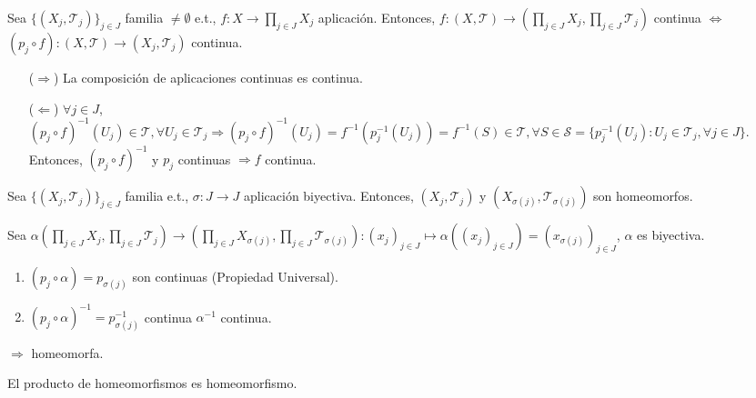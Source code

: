\begin{prop}
  Sea $\{ ( X_{j}, \mathcal{T}_{j} ) \}_{j \in J}$ familia $\neq \emptyset$ e.t., $f: X \to \prod_{j \in J} X_{j}$ aplicación. Entonces, $f: ( X, \mathcal{T} ) \to ( \prod_{j \in J} X_{j}, \prod_{j \in J} \mathcal{T}_{j} )$ continua $\Leftrightarrow$ $(p_{j} \circ f): ( X, \mathcal{T} ) \to ( X_{j}, \mathcal{T}_{j} )$ continua.
\end{prop}

\begin{dem}
  \begin{enumerate}[label=(\roman*)]
    \item [($\Rightarrow$)] La composición de aplicaciones continuas es continua.
    \item [($\Leftarrow$)] $\forall j \in J$, $(p_{j} \circ f)^{-1}(U_{j}) \in \mathcal{T}, \forall U_{j} \in \mathcal{T}_{j} \Rightarrow (p_{j} \circ f)^{-1}(U_{j}) = f^{-1}(p_{j}^{-1}(U_{j})) = f^{-1}(S) \in \mathcal{T}, \forall S \in \mathcal{S} = \{ p_{j}^{-1}(U_{j}) : U_{j} \in \mathcal{T}_{j}, \forall j \in J \}$. Entonces, $(p_{j} \circ f)^{-1}$ y $p_{j}$ continuas $\Rightarrow f$ continua.
  \end{enumerate}
\end{dem}

\begin{prop}
  Sea $\{ ( X_{j}, \mathcal{T}_{j} ) \}_{j \in J}$ familia e.t., $\sigma: J \to J$ aplicación biyectiva. Entonces, $( X_{j}, \mathcal{T}_{j} )$ y $( X_{\sigma(j)}, \mathcal{T}_{\sigma(j)} )$ son homeomorfos.
\end{prop}

\begin{dem}
  Sea $\alpha ( \prod_{j \in J} X_{j}, \prod_{j \in J} \mathcal{T}_{j} ) \to ( \prod_{j \in J} X_{\sigma(j)}, \prod_{j \in J} \mathcal{T}_{\sigma(j)} ): ( x_{j} )_{j \in J} \mapsto \alpha(( x_{j} )_{j \in J}) = ( x_{\sigma(j)} )_{j \in J}$, $\alpha$ es biyectiva.
  \begin{enumerate}[label=(\roman*)]
    \item $(p_{j} \circ \alpha) = p_{\sigma(j)}$ son continuas (Propiedad Universal).
    \item $(p_{j} \circ \alpha)^{-1} = p_{\sigma(j)}^{-1}$ continua $\alpha^{-1}$ continua.
  \end{enumerate}
  $\Rightarrow$ homeomorfa.
\end{dem}

\begin{obs}
  El producto de homeomorfismos es homeomorfismo.
\end{obs}

